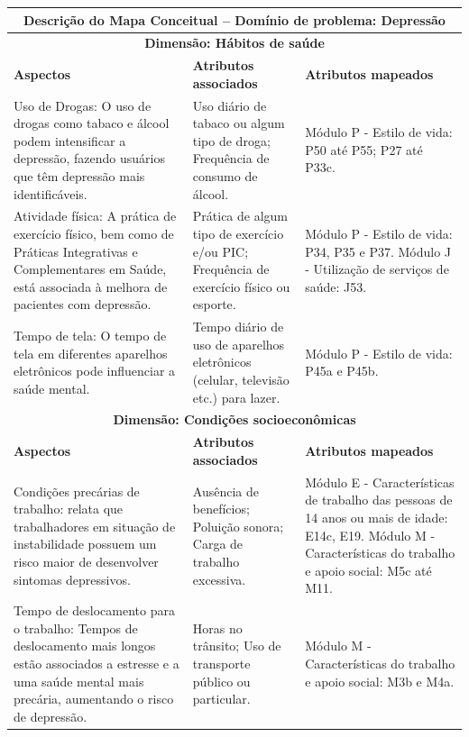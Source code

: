 \documentclass[12pt]{article}
\begin{document}
\begingroup
\tiny
\begin{longtable}
{|p{5cm}|p{4cm}|p{4cm}|}
\hline
\multicolumn{3}{|c|}{\textbf{Descrição do Mapa Conceitual – Domínio de problema: Depressão}} \\ \hline
\multicolumn{3}{|c|}{\textbf{Dimensão: Hábitos de saúde}} \\ \hline
\textbf{Aspectos} & \textbf{Atributos associados} & \textbf{Atributos mapeados} \\ \hline
{Uso de Drogas: O uso de drogas como tabaco e álcool podem intensificar a depressão, fazendo usuários que têm depressão mais identificáveis. \cite{beneton2021sintomas}} & {Uso diário de tabaco ou algum tipo de droga; Frequência de consumo de álcool.} & {Módulo P - Estilo de vida: P50 até P55; P27 até P33c.} \\ \hline
{Atividade física: A prática de exercício físico, bem como de Práticas Integrativas e Complementares em Saúde, está associada à melhora de pacientes com depressão. \cite{Oliveira_2023} \cite{schwambach2023uso}} & {Prática de algum tipo de exercício e/ou PIC; Frequência de exercício físico ou esporte.} & {Módulo P - Estilo de vida: P34, P35 e P37. Módulo J - Utilização de serviços de saúde: J53.} \\ \hline
{Tempo de tela: O tempo de tela em diferentes aparelhos eletrônicos pode influenciar a saúde mental. \cite{Li_2022}} & {Tempo diário de uso de aparelhos eletrônicos (celular, televisão etc.) para lazer.} & {Módulo P - Estilo de vida: P45a e P45b.} \\ \hline
\multicolumn{3}{|c|}{\textbf{Dimensão: Condições socioeconômicas}} \\ \hline
\textbf{Aspectos} & \textbf{Atributos associados} & \textbf{Atributos mapeados} \\ \hline
{Condições precárias de trabalho: \cite{Yang_2024} relata que trabalhadores em situação de instabilidade possuem um risco maior de desenvolver sintomas depressivos.} & {Ausência de benefícios; Poluição sonora; Carga de trabalho excessiva.} & {Módulo E - Características de trabalho das pessoas de 14 anos ou mais de idade: E14c, E19. Módulo M - Características do trabalho e apoio social: M5c até M11.} \\ \hline
{Tempo de deslocamento para o trabalho: Tempos de deslocamento mais longos estão associados a estresse e a uma saúde mental mais precária, aumentando o risco de depressão. \cite{Wang_2019}} & {Horas no trânsito; Uso de transporte público ou particular.} & {Módulo M - Características do trabalho e apoio social: M3b e M4a.} \\ \hline

\end{longtable}
\end{document}
